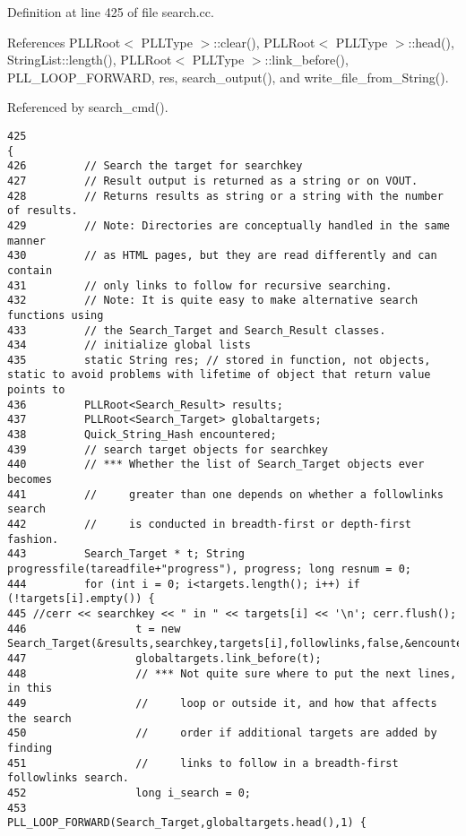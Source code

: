 Definition at line 425 of file search.cc.

References PLLRoot$<$ PLLType $>$::clear(), PLLRoot$<$ PLLType $>$::head(), String\-List::length(), PLLRoot$<$ PLLType $>$::link\_\-before(), PLL\_\-LOOP\_\-FORWARD, res, search\_\-output(), and write\_\-file\_\-from\_\-String().

Referenced by search\_\-cmd().



\footnotesize\begin{verbatim}425                                                                                 {
426         // Search the target for searchkey
427         // Result output is returned as a string or on VOUT.
428         // Returns results as string or a string with the number of results.
429         // Note: Directories are conceptually handled in the same manner
430         // as HTML pages, but they are read differently and can contain
431         // only links to follow for recursive searching.
432         // Note: It is quite easy to make alternative search functions using
433         // the Search_Target and Search_Result classes.
434         // initialize global lists
435         static String res; // stored in function, not objects, static to avoid problems with lifetime of object that return value points to
436         PLLRoot<Search_Result> results;
437         PLLRoot<Search_Target> globaltargets;
438         Quick_String_Hash encountered;
439         // search target objects for searchkey
440         // *** Whether the list of Search_Target objects ever becomes
441         //     greater than one depends on whether a followlinks search
442         //     is conducted in breadth-first or depth-first fashion.
443         Search_Target * t; String progressfile(tareadfile+"progress"), progress; long resnum = 0;
444         for (int i = 0; i<targets.length(); i++) if (!targets[i].empty()) {
445 //cerr << searchkey << " in " << targets[i] << '\n'; cerr.flush();
446                 t = new Search_Target(&results,searchkey,targets[i],followlinks,false,&encountered);
447                 globaltargets.link_before(t);
448                 // *** Not quite sure where to put the next lines, in this
449                 //     loop or outside it, and how that affects the search
450                 //     order if additional targets are added by finding
451                 //     links to follow in a breadth-first followlinks search.
452                 long i_search = 0;
453                 PLL_LOOP_FORWARD(Search_Target,globaltargets.head(),1) {

\end{verbatim}
